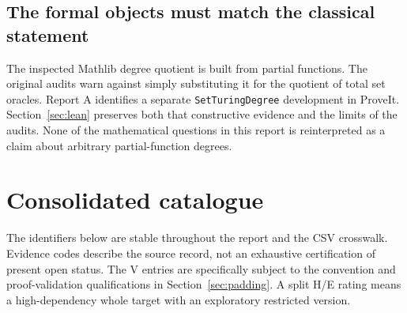 \documentclass[11pt,a4paper]{article}
\theoremstyle{definition}\newtheorem{definition}[theorem]{Definition}
\theoremstyle{remark}\newtheorem{remark}[theorem]{Remark}
\begin{document}
\subsection{The formal objects must match the classical statement}
The inspected Mathlib degree quotient is built from partial functions. The original audits warn against simply substituting it for the quotient of total set oracles. Report A identifies a separate \texttt{SetTuringDegree} development in ProveIt. Section~\ref{sec:lean} preserves both that constructive evidence and the limits of the audits. None of the mathematical questions in this report is reinterpreted as a claim about arbitrary partial-function degrees.\cite{Mathlib,MathlibDoc,ProveIt}


\section{Consolidated catalogue}
\label{sec:catalogue}
The identifiers below are stable throughout the report and the CSV crosswalk. Evidence codes describe the source record, not an exhaustive certification of present open status. The V entries are specifically subject to the convention and proof-validation qualifications in Section~\ref{sec:padding}. A split H/E rating means a high-dependency whole target with an exploratory restricted version.
\small
\end{document}
